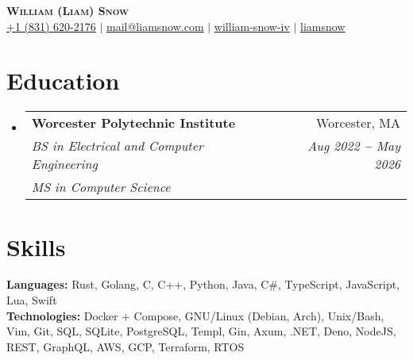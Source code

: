 \documentclass[12pt]{article}
\makeatletter
\newcommand{\entry}[1]{
  \item\small{
    {#1 \vspace{-2pt}}
  }
}
\newcommand{\educationheading}[6]{
  \vspace{-2pt}\item
    \begin{tabular*}{0.97\textwidth}[t]{l@{\extracolsep{\fill}}r}
      \textbf{#1} & #2 \\
      \textit{\small#3} & \textit{\small #4} \\
      \textit{\small#5} & \textit{\small #6} \\
    \end{tabular*}\vspace{-5pt}
}
\newcommand{\subheadingliststart}{\begin{itemize}[leftmargin=0.15in, label={}]}
\newcommand{\subheadinglistend}{\end{itemize}}
\makeatother
\begin{document}
\begin{center}
  \textbf{\Huge \scshape William (Liam) Snow} \\ \vspace{3pt}
    \small
    \faMobile \hspace{.5pt} \href{tel:8316202176}{+1 (831) 620-2176}
    $|$
    \faAt \hspace{.5pt} \href{mailto:mail@liamsnow.com}{mail@liamsnow.com}
    $|$
    \faLinkedinSquare \hspace{.5pt} \href{https://www.linkedin.com/in/william-snow-iv-140438169/}{william-snow-iv}
    $|$
    \faGithub \hspace{.5pt} \href{https://github.com/liamsnow}{liamsnow}
\end{center}

\section{Education}
  \vspace{3pt}
  \subheadingliststart
    \educationheading
      {Worcester Polytechnic Institute}{Worcester, MA}
      {BS in Electrical and Computer Engineering}{Aug 2022 \textbf{--} May 2026}
      {MS in Computer Science}{}
  \subheadinglistend

\section{Skills}
  \vspace{2pt}
  \subheadingliststart
    \small{\entry{
        \textbf{Languages:}{ Rust, Golang, C, C++, Python, Java, C\#, TypeScript, JavaScript, Lua, Swift } \\ \vspace{3pt}
        \textbf{Technologies:}{ Docker + Compose, GNU/Linux (Debian, Arch), Unix/Bash, Vim, Git, SQL, SQLite, PostgreSQL, Templ, Gin, Axum, .NET, Deno, NodeJS, REST, GraphQL, AWS, GCP, Terraform, RTOS  } \\ \vspace{3pt}
    }}
  \subheadinglistend
\end{document}
